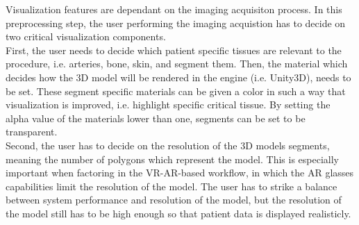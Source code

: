Visualization features are dependant on the imaging acquisiton process.
In this preprocessing step, the user performing the imaging acquistion has to decide on two critical visualization components.
\\ First, the user needs to decide which patient specific tissues are relevant to the procedure, i.e. arteries, bone, skin, and segment them.
Then, the material which decides how the 3D model will be rendered in the engine (i.e. Unity3D), needs to be set.
These segment specific materials can be given a color in such a way that visualization is improved, i.e. highlight specific critical tissue.
By setting the alpha value of the materials lower than one, segments can be set to be transparent.
\\ Second, the user has to decide on the resolution of the 3D models segments, meaning the number of polygons which represent the model.
This is especially important when factoring in the VR-AR-based workflow, in which the AR glasses capabilities limit the resolution of the model.
The user has to strike a balance between system performance and resolution of the model, but the resolution of the model still has to be high enough so that patient data is displayed realisticly.

